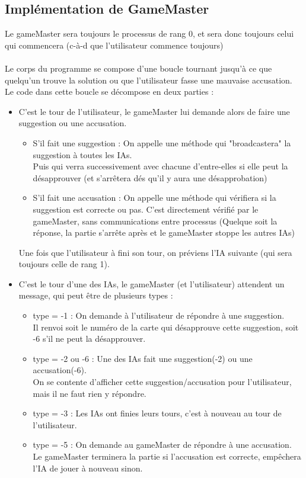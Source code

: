 \documentclass[a4paper,10pt]{article}
\begin{document}
	\subsection{Implémentation de GameMaster}
		Le gameMaster sera toujours le processus de rang 0, et sera donc toujours celui qui commencera (c-à-d que l'utilisateur commence toujours)\\
		\\
		Le corps du programme se compose d'une boucle tournant jusqu'à ce que quelqu'un trouve la solution ou que l'utilisateur fasse une mauvaise accusation.
		Le code dans cette boucle se décompose en deux parties :
		\begin{itemize}
			\item C'est le tour de l'utilisateur, le gameMaster lui demande alors de faire une suggestion ou une accusation.
				\begin{itemize}
					\item S'il fait une suggestion : On appelle une méthode qui "broadcastera" la suggestion à toutes les IAs.\\
						 Puis qui verra successivement avec chacune d'entre-elles si elle peut la désapprouver (et s'arrêtera dés qu'il y aura une désapprobation)
					\item S'il fait une accusation : On appelle une méthode qui vérifiera si la suggestion est correcte ou pas.
							C'est directement vérifié par le gameMaster, sans communications entre processus (Quelque soit la réponse, la partie s'arrête après et le gameMaster stoppe les autres IAs)
				\end{itemize}
				Une fois que l'utilisateur à fini son tour, on préviens l'IA suivante (qui sera toujours celle de rang 1).
			\item C'est le tour d'une des IAs, le gameMaster (et l'utilisateur) attendent un message, qui peut être de plusieurs types :
				\begin{itemize}
					\item type = -1 : On demande à l'utilisateur de répondre à une suggestion.\\
								Il renvoi soit le numéro de la carte qui désapprouve cette suggestion, soit -6 s'il ne peut la désapprouver.
					\item type = -2 ou -6 : Une des IAs fait une suggestion(-2) ou une accusation(-6).\\
								On se contente d'afficher cette suggestion/accusation pour l'utilisateur, mais il ne faut rien y répondre.
					\item type = -3 : Les IAs ont finies leurs tours, c'est à nouveau au tour de l'utilisateur.
					\item type = -5 : On demande au gameMaster de répondre à une accusation.\\
								Le gameMaster terminera la partie si l'accusation est correcte, empêchera l'IA de jouer à nouveau sinon.
				\end{itemize}
		\end{itemize}
	
\end{document}
